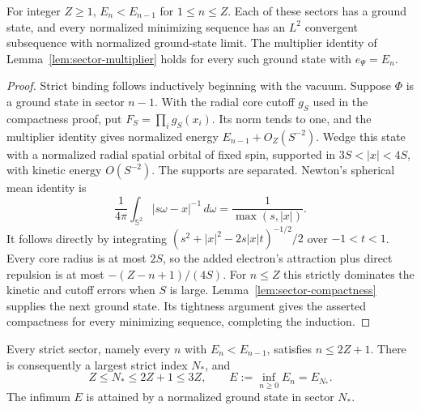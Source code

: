 \begin{lemma}\label{lem:atomic-binding}
For integer $Z\ge1$, $E_n<E_{n-1}$ for $1\le n\le Z$.
Each of these sectors has a ground state, and every normalized minimizing
sequence has an $L^2$ convergent subsequence with normalized ground-state limit.
The multiplier identity of Lemma~\ref{lem:sector-multiplier} holds for every
such ground state with $e_\Psi=E_n$.
\end{lemma}
\begin{proof}
Strict binding follows inductively beginning with the vacuum. Suppose
$\Phi$ is a ground state in sector $n-1$. With the radial core cutoff
$g_S$ used in the compactness proof, put $F_S=\prod_i g_S(x_i)$.
Its norm tends to one, and the multiplier identity gives normalized
energy $E_{n-1}+O_Z(S^{-2})$. Wedge this state with a normalized radial
spatial orbital of fixed spin, supported in $3S<|x|<4S$, with kinetic
energy $O(S^{-2})$. The supports are separated. Newton's spherical mean
identity is
\begin{equation}\label{eq:atomic-newton}
 \frac1{4\pi}\int_{\mathbb S^2}|s\omega-x|^{-1}\,d\omega
 =\frac1{\max(s,|x|)}.
\end{equation}
It follows directly by integrating
$(s^2+|x|^2-2s|x|t)^{-1/2}/2$ over $-1<t<1$.
Every core radius is at most $2S$, so the added electron's attraction
plus direct repulsion is at most $-(Z-n+1)/(4S)$. For $n\le Z$ this
strictly dominates the kinetic and cutoff errors when $S$ is large.
Lemma~\ref{lem:sector-compactness} supplies the next ground state.
Its tightness argument gives the asserted compactness for every minimizing
sequence, completing the induction.
\end{proof}
\begin{lemma}\label{lem:atomic-sector}
Every strict sector, namely every $n$ with $E_n<E_{n-1}$, satisfies
$n\leq2Z+1$.  There is consequently a largest strict index $N_*$,
and
\begin{equation}\label{a:eq:found-sector}
 Z\leq N_*\leq2Z+1\leq3Z,
 \qquad E:=\inf_{n\geq0}E_n=E_{N_*}.
\end{equation}
The infimum $E$ is attained by a normalized ground state in sector
$N_*$.
\end{lemma}

